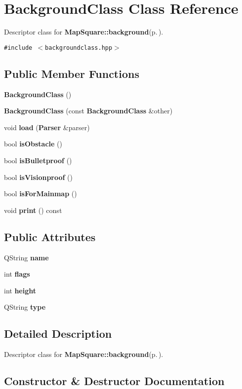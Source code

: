 \section{Background\-Class Class Reference}
\label{classBackgroundClass}
Descriptor class for {\bf Map\-Square::background}{\rm (p.\,\pageref{classMapSquare_o0})}.  


{\tt \#include $<$backgroundclass.hpp$>$}

\subsection*{Public Member Functions}
\begin{CompactItemize}
\item 
{\bf Background\-Class} ()
\item 
{\bf Background\-Class} (const {\bf Background\-Class} \&other)
\item 
void {\bf load} ({\bf Parser} \&parser)
\item 
bool {\bf is\-Obstacle} ()
\item 
bool {\bf is\-Bulletproof} ()
\item 
bool {\bf is\-Visionproof} ()
\item 
bool {\bf is\-For\-Mainmap} ()
\item 
void {\bf print} () const 
\end{CompactItemize}
\subsection*{Public Attributes}
\begin{CompactItemize}
\item 
QString {\bf name}
\item 
int {\bf flags}
\item 
int {\bf height}
\item 
QString {\bf type}
\end{CompactItemize}


\subsection{Detailed Description}
Descriptor class for {\bf Map\-Square::background}{\rm (p.\,\pageref{classMapSquare_o0})}. 



\subsection{Constructor \& Destructor Documentation}
